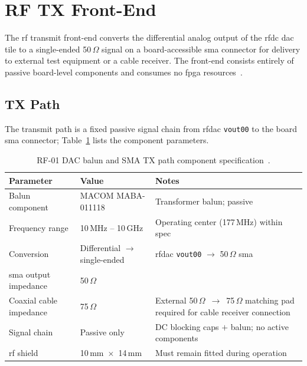 \section{RF TX Front-End}
\label{sec:rf_frontend}

The \ac{rf} transmit front-end converts the differential analog
output of the \ac{rfdc} \ac{dac} tile to a single-ended 50\,$\Omega$
signal on a board-accessible \ac{sma} connector for delivery to
external test equipment or a cable receiver.
The front-end consists entirely of passive board-level components
and consumes no \ac{fpga} resources~\cite{RealDigital_A6}.

\subsection{TX Path}
\label{subsec:rf_tx}

The transmit path is a fixed passive signal chain from
\ac{rfdac} \texttt{vout00} to the board \ac{sma} connector;
Table~\ref{tab:rf01_spec} lists the component parameters.

\begin{table}[htbp]
  \caption{RF-01 DAC balun and SMA TX path component
           specification~\cite{RealDigital_A6}.}
  \label{tab:rf01_spec}
  \centering
  \small
  \begin{tabular}{p{4.5cm}p{4.0cm}p{6.0cm}}
    \hline
    Parameter & Value & Notes \\
    \hline
    Balun component
      & MACOM MABA-011118
      & Transformer balun; passive \\[3pt]
    Frequency range
      & 10\,MHz -- 10\,GHz
      & Operating center (177\,MHz) within spec \\[3pt]
    Conversion
      & Differential $\to$ single-ended
      & \ac{rfdac} \texttt{vout00} $\to$ 50\,$\Omega$ \ac{sma} \\[3pt]
    \ac{sma} output impedance
      & 50\,$\Omega$
      & \\[3pt]
    Coaxial cable impedance
      & 75\,$\Omega$
      & External 50\,$\Omega$~$\to$~75\,$\Omega$ matching pad
        required for cable receiver connection \\[3pt]
    Signal chain
      & Passive only
      & DC blocking caps $+$ balun; no active components \\[3pt]
    \ac{rf} shield
      & 10\,mm~$\times$~14\,mm
      & Must remain fitted during operation \\
    \hline
  \end{tabular}
\end{table}

